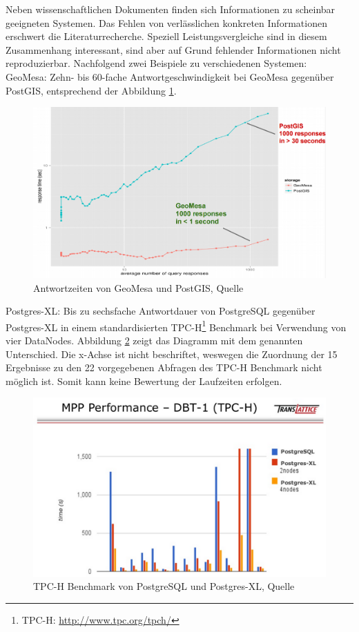 Neben wissenschaftlichen Dokumenten finden sich Informationen zu scheinbar geeigneten Systemen.
Das Fehlen von verlässlichen konkreten Informationen erschwert die Literaturrecherche.
Speziell Leistungsvergleiche sind in diesem Zusammenhang interessant, sind aber auf Grund fehlender Informationen nicht reproduzierbar.
Nachfolgend zwei Beispiele zu verschiedenen Systemen:\\
GeoMesa: Zehn- bis 60-fache Antwortgeschwindigkeit bei GeoMesa gegenüber PostGIS, entsprechend der Abbildung \ref{fig:geomesaversuspostgis}.
\begin{figure}[hp]
\centering
\includegraphics[width=.8\textwidth]{Abbildungen/geomesa_versus_postgis.png}
\caption[Antwortzeiten von GeoMesa und PostGIS]{Antwortzeiten von GeoMesa und PostGIS, Quelle \cite[S.24]{website:slideshare:geomesa}}
\label{fig:geomesaversuspostgis}
\end{figure}

Postgres-XL: Bis zu sechsfache Antwortdauer von PostgreSQL gegenüber Postgres-XL in einem standardisierten TPC-H\footnote{TPC-H: \url{http://www.tpc.org/tpch/}} Benchmark bei Verwendung von vier DataNodes. Abbildung \ref{fig:pgxcversuspgsql} zeigt das Diagramm mit dem genannten Unterschied.
Die x-Achse ist nicht beschriftet, weswegen die Zuordnung der 15 Ergebnisse zu den 22 vorgegebenen Abfragen des TPC-H Benchmark nicht möglich ist.
Somit kann keine Bewertung der Laufzeiten erfolgen.
\begin{figure}
\centering
\includegraphics[width=.8\textwidth]{Abbildungen/postgresxl_versus_postgis.png}
\caption[TPC-H Benchmark von PostgreSQL und Postgres-XL]{TPC-H Benchmark von PostgreSQL und Postgres-XL, Quelle \cite[S.12]{website:slideshare:pgxc}}
\label{fig:pgxcversuspgsql}
\end{figure}

